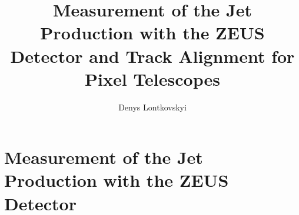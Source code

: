 \documentclass[14pt,a4paper,reqno,twoside,draft]{scrbook}%
\numberwithin{equation}{subsection}
\begin{document}
\title[]{Measurement of the Jet Production with the ZEUS Detector and Track Alignment for Pixel Telescopes}
\author[D. Lontkovskyi]{Denys Lontkovskyi}

\maketitle
\tableofcontents


%

\mainmatter



\part{Measurement of the Jet Production with the ZEUS Detector}


\end{document}
